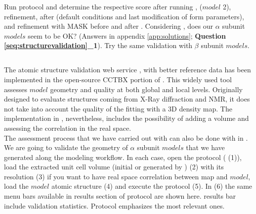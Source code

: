  Run \emringer protocol and determine the respective score after running , \chimera {} ($model$ 2), \coot refinement, \phenix {} after \coot (default conditions and last modification of form parameters), and  refinement with MASK before and after \phenix {}. Considering \emringer {}, does our  $\alpha$ subunit $models$ seem to be OK? (Answers in appendix \ref{app:solutions}; \textbf{Question \ref{seq:structurevalidation}\_1}). Try the same validation with $\beta$ subunit $models$. \\
 
 \subsection*{\molprobity}
 
 The atomic structure validation web service \molprobity, with better reference data has been implemented in the open-source CCTBX portion of \phenix \citep{williams2018}. This widely used tool assesses $model$ geometry and quality at both global and local levels. Originally designed to evaluate structures coming from X-Ray diffraction and NMR, it does not take into account the quality of the fitting with a 3D density map.  The implementation in \phenix, nevertheless, includes the possibility of adding a volume and assessing the correlation in the real space.\\
 
 The assessment process that we have carried out with \emringer can also be done with \molprobity in \scipion. We are going to validate the geometry of  $\alpha$ subunit $models$ that we have generated along the modeling workflow. In each case, open the  protocol ( (1)), load the extracted unit cell volume (initial or generated by \coot) (2) with its resolution (3) if you want to have real space correlation between map and $model$, load the $model$ atomic structure (4) and execute the protocol (5). In  (6) the same menu bars available in results section of \phenix {} protocol are shown here. \molprobity results bar include validation statistics. Protocol  emphasizes the most relevant ones.\\
 
